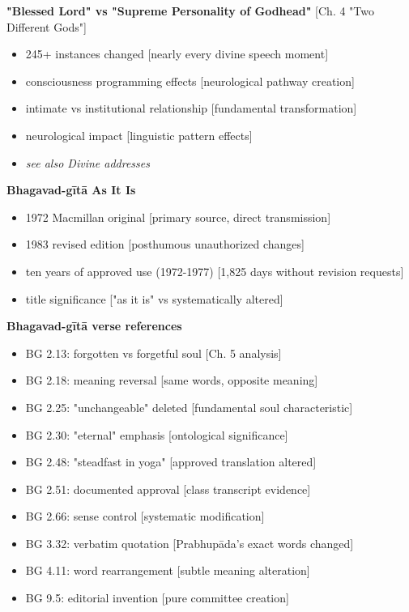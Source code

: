 \documentclass[11pt,twoside]{book}
\begin{document}
\textbf{\textbf{"Blessed Lord" vs "Supreme Personality of Godhead"}} {[}Ch. 4 "Two Different Gods"]
\begin{itemize}
\item 245+ instances changed [nearly every divine speech moment]
\item consciousness programming effects [neurological pathway creation]
\item intimate vs institutional relationship [fundamental transformation]
\item neurological impact [linguistic pattern effects]
\item \emph{see also Divine addresses}
\end{itemize}

\textbf{\textbf{Bhagavad-gītā As It Is}}
\begin{itemize}
\item 1972 Macmillan original [primary source, direct transmission]
\item 1983 revised edition [posthumous unauthorized changes]
\item ten years of approved use (1972-1977) [1,825 days without revision requests]
\item title significance ["as it is" vs systematically altered]
\end{itemize}

\textbf{\textbf{Bhagavad-gītā verse references}}
\begin{itemize}
\item BG 2.13: forgotten vs forgetful soul [Ch. 5 analysis]
\item BG 2.18: meaning reversal [same words, opposite meaning]
\item BG 2.25: "unchangeable" deleted [fundamental soul characteristic]
\item BG 2.30: "eternal" emphasis [ontological significance]
\item BG 2.48: "steadfast in yoga" [approved translation altered]
\item BG 2.51: documented approval [class transcript evidence]
\item BG 2.66: sense control [systematic modification]
\item BG 3.32: verbatim quotation [Prabhupāda's exact words changed]
\item BG 4.11: word rearrangement [subtle meaning alteration]
\item BG 9.5: editorial invention [pure committee creation]
\end{itemize}
\end{document}
